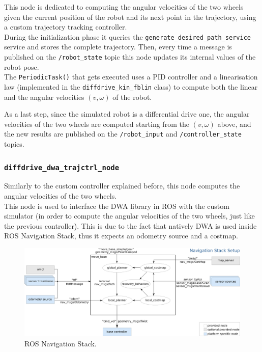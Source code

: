 \documentclass[11pt,a4paper]{article}
\begin{document}
This node is dedicated to computing the angular velocities of the two wheels given the current position
of the robot and its next point in the trajectory, using a custom trajectory tracking controller.\\

During the initialization phase it queries the \texttt{generate\_desired\_path\_service} service and
stores the complete trajectory.
Then, every time a message is published on the \texttt{/robot\_state} topic this node updates its
internal values of the robot pose.\\

The \texttt{PeriodicTask()} that gets executed uses a PID controller and a linearisation law (implemented
in the \texttt{diffdrive\_kin\_fblin} class) to compute both the linear and the angular velocities
$(v, \omega)$ of the robot.

As a last step, since the simulated robot is a differential drive one, the angular velocities of
the two wheels are computed starting from the $(v, \omega)$ above, and the new results are published
on the \texttt{/robot\_input} and \texttt{/controller\_state} topics.

\subsubsection{\texttt{diffdrive\_dwa\_trajctrl\_node}}

Similarly to the custom controller explained before, this node computes the angular velocities of
the two wheels.\\

This node is used to interface the DWA library in ROS with the custom simulator (in order to compute
the angular velocities of the two wheels, just like the previous controller).
This is due to the fact that natively DWA is used inside ROS Navigation Stack, thus it expects
an odometry source and a costmap.\\

\begin{figure}[H]
    \centering
    \includegraphics[scale=0.4]{other/navigation_stack.png}
    \caption{ROS Navigation Stack.}
\end{figure}
\end{document}
